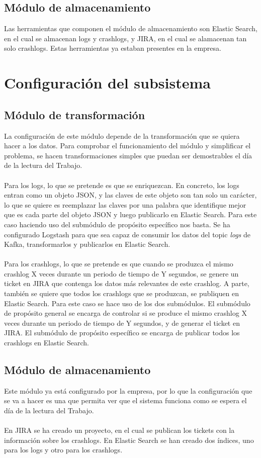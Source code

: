 \subsection{Módulo de almacenamiento}
Las herramientas que componen el módulo de almacenamiento son Elastic Search, en el cual se almacenan logs y crashlogs, y JIRA, en el cual se alamacenan tan solo crashlogs. Estas herramientas ya estaban presentes en la empresa.

\section{Configuración del subsistema}

\subsection{Módulo de transformación}
La configuración de este módulo depende de la transformación que se quiera hacer a los datos. Para comprobar el funcionamiento del módulo y simplificar el problema, se hacen transformaciones simples que puedan ser demostrables el día de la lectura del Trabajo.
\\\\
Para los logs, lo que se pretende es que se enriquezcan. En concreto, los logs entran como un objeto JSON, y las claves de este objeto son tan solo un carácter, lo que se quiere es reemplazar las claves por una palabra que identifique mejor que es cada parte del objeto JSON y luego publicarlo en Elastic Search. Para este caso haciendo uso del submódulo de propósito específico nos basta. Se ha configurado Logstash para que sea capaz de consumir los datos del topic \textit{logs} de Kafka, transformarlos y publicarlos en Elastic Search. 
\\\\
Para los crashlogs, lo que se pretende es que cuando se produzca el mismo crashlog X veces durante un periodo de tiempo de Y segundos, se genere un ticket en JIRA que contenga los datos más relevantes de este crashlog. A parte, también se quiere que todos los crashlogs que se produzcan, se publiquen en Elastic Search. Para este caso se hace uso de los dos submódulos. El submódulo de propósito general se encarga de controlar si se produce el mismo crashlog X veces durante un periodo de tiempo de Y segundos, y de generar el ticket en JIRA. El submódulo de propósito específico se encarga de publicar todos los crashlogs en Elastic Search.

\subsection{Módulo de almacenamiento}
Este módulo ya está configurado por la empresa, por lo que la configuración que se va a hacer es una que permita ver que el sistema funciona como se espera el día de la lectura del Trabajo.
\\\\
En JIRA se ha creado un proyecto, en el cual se publican los tickets con la información sobre los crashlogs.
En Elastic Search se han creado dos índices, uno para los logs y otro para los crashlogs.

